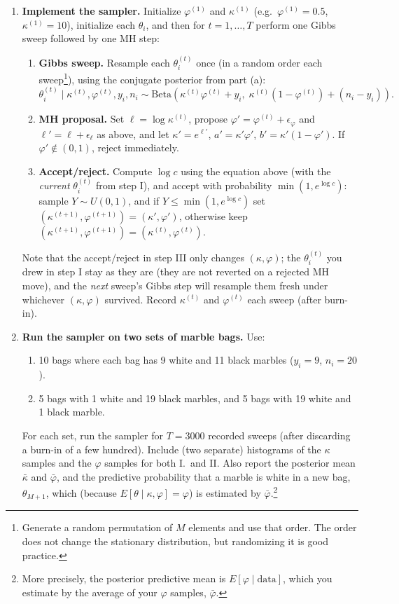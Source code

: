 \documentclass[11pt]{article}
\begin{document}
\begin{enumerate}
\begin{enumerate}
\item {\bf Implement the sampler.} Initialize $\varphi^{(1)}$ and $\kappa^{(1)}$ (e.g.\ $\varphi^{(1)}=0.5$, $\kappa^{(1)}=10$), initialize each $\theta_i$, and then for $t = 1,\dotsc,T$ perform one Gibbs sweep followed by one MH step:
\begin{enumerate}
\item[I.] {\bf Gibbs sweep.} Resample each $\theta_i^{(t)}$ once (in a random order each sweep\footnote{Generate a random permutation of $M$ elements and use that order. The order does not change the stationary distribution, but randomizing it is good practice.}), using the conjugate posterior from part (a):
\begin{equation*}
\theta_i^{(t)} \mid \kappa^{(t)}, \varphi^{(t)}, y_i, n_i \sim \mathrm{Beta}\left( \kappa^{(t)}\varphi^{(t)} + y_i,\; \kappa^{(t)}(1-\varphi^{(t)}) + (n_i - y_i) \right).
\end{equation*}
\item[II.] {\bf MH proposal.} Set $\ell = \log\kappa^{(t)}$, propose $\varphi' = \varphi^{(t)} + \epsilon_\varphi$ and $\ell' = \ell + \epsilon_\ell$ as above, and let $\kappa' = e^{\ell'}$, $a' = \kappa'\varphi'$, $b' = \kappa'(1-\varphi')$. If $\varphi' \notin (0,1)$, reject immediately.
\item[III.] {\bf Accept/reject.} Compute $\log c$ using the equation above (with the {\em current} $\theta_i^{(t)}$ from step I), and accept with probability $\min(1, e^{\log c})$: sample $Y \sim U(0,1)$, and if $Y \le \min(1, e^{\log c})$ set $(\kappa^{(t+1)}, \varphi^{(t+1)}) = (\kappa', \varphi')$, otherwise keep $(\kappa^{(t+1)}, \varphi^{(t+1)}) = (\kappa^{(t)}, \varphi^{(t)})$.
\end{enumerate}
Note that the accept/reject in step III only changes $(\kappa,\varphi)$; the $\theta_i^{(t)}$ you drew in step I stay as they are (they are not reverted on a rejected MH move), and the {\em next} sweep's Gibbs step will resample them fresh under whichever $(\kappa,\varphi)$ survived. Record $\kappa^{(t)}$ and $\varphi^{(t)}$ each sweep (after burn-in).

\item {\bf Run the sampler on two sets of marble bags.} Use:
\begin{enumerate}
\item[I.] 10 bags where each bag has 9 white and 11 black marbles ($y_i=9$, $n_i=20$).
\item[II.] 5 bags with 1 white and 19 black marbles, and 5 bags with 19 white and 1 black marble.
\end{enumerate}
For each set, run the sampler for $T=3000$ recorded sweeps (after discarding a burn-in of a few hundred). Include (two separate) histograms of the $\kappa$ samples and the $\varphi$ samples for both I.\ and II. Also report the posterior mean $\bar\kappa$ and $\bar\varphi$, and the predictive probability that a marble is white in a new bag, $\theta_{M+1}$, which (because $E[\theta \mid \kappa,\varphi] = \varphi$) is estimated by $\bar\varphi$.\footnote{More precisely, the posterior predictive mean is $E[\varphi \mid \text{data}]$, which you estimate by the average of your $\varphi$ samples, $\bar\varphi$.}


\end{enumerate}
\end{enumerate}
\end{document}
